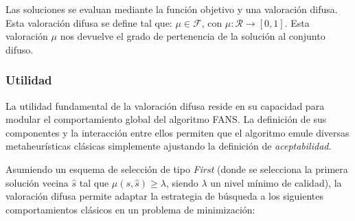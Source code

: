 Las soluciones se evaluan mediante la función objetivo y una valoración difusa. Esta valoración difusa se define tal que:
$\mu \in \mathcal{F}$, con $\mu : \mathcal{R} \rightarrow [0,1]$. Esta valoración $\mu$ nos devuelve el grado de pertenencia de la solución al conjunto difuso.

\subsubsection{Utilidad}

La utilidad fundamental de la valoración difusa reside en su capacidad para modular el comportamiento global del algoritmo FANS. La definición de sus componentes y la interacción entre ellos permiten que el algoritmo emule diversas metaheurísticas clásicas simplemente ajustando la definición de \emph{aceptabilidad}.

Asumiendo un esquema de selección de tipo \emph{First} (donde se selecciona la primera solución vecina $\hat{s}$ tal que $\mu(s, \hat{s}) \ge \lambda$, siendo $\lambda$ un nivel mínimo de calidad), la valoración difusa permite adaptar la estrategia de búsqueda a los siguientes comportamientos clásicos en un problema de minimización:

